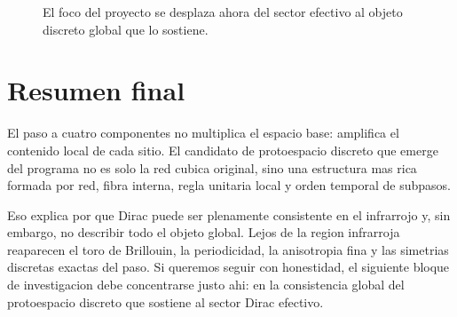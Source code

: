 \begin{figure}[h!]
\centering
{}
\caption{El foco del proyecto se desplaza ahora del sector efectivo al objeto discreto global que lo sostiene.}
\end{figure}

\section{Resumen final}
El paso a cuatro componentes no multiplica el espacio base: amplifica el contenido local de cada sitio. El candidato de protoespacio discreto que emerge del programa no es solo la red cubica original, sino una estructura mas rica formada por red, fibra interna, regla unitaria local y orden temporal de subpasos.

Eso explica por que Dirac puede ser plenamente consistente en el infrarrojo y, sin embargo, no describir todo el objeto global. Lejos de la region infrarroja reaparecen el toro de Brillouin, la periodicidad, la anisotropia fina y las simetrias discretas exactas del paso. Si queremos seguir con honestidad, el siguiente bloque de investigacion debe concentrarse justo ahi: en la consistencia global del protoespacio discreto que sostiene al sector Dirac efectivo.
